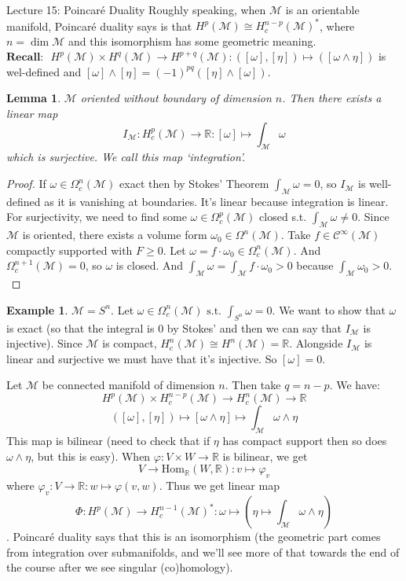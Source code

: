 \documentclass[10pt]{article}
\theoremstyle{plain}
\newtheorem{lemma}[thm]{Lemma}
\theoremstyle{definition}
\newtheorem{exmp}[thm]{Example} %
\newcommand{\st}{\text{ s.t. }}
\newcommand{\Recall}{\textbf{Recall: }}
\newcommand{\Real}{\mathbb{R}}
\newcommand{\man}{\mathcal{M}}
\newcommand{\HomReal}[2]{\text{Hom}_\Real\left(#1,#2\right)}
\newcommand{\pformman}[1]{\Omega^{#1}(\man)}
\newcommand{\compactpformman}[1]{\Omega^{#1}_c(\man)}
\newcommand{\cts}[1]{\mathcal{C}^{\infty}(#1)}
\newcommand{\cohomman}[1]{H^{#1}(\man)}
\newcommand{\compactcohomman}[1]{H_c^{#1}(\man)}
\begin{document}
\begin{section}{Lecture 15: Poincar\'e Duality}
Roughly speaking, when $\man$ is an orientable manifold, Poincar\'e duality says is that $\cohomman{p} \cong \compactcohomman{n-p}^*$, where $n = \dim \man$ and this isomorphism has some geometric meaning.\\
$\Recall$ $\cohomman{p} \times \cohomman{q} \to \cohomman{p+q} : ([\omega],[\eta]) \mapsto ([\omega \wedge \eta] )$ is wel-defined and $[\omega] \wedge [\eta]  = (-1)^{pq}([\eta]\wedge [ \omega])$.
\begin{lemma}
$\man$ oriented without boundary of dimension $n$. Then there exists a linear map 
$$I_\man : \compactcohomman{p} \to \Real: [\omega] \mapsto \int_\man \omega$$
which is surjective. We call this map `integration'.
\end{lemma}
\begin{proof}
If $\omega \in \compactpformman{n}$ exact then by Stokes' Theorem $\int_ \man \omega = 0$, so $I_\man$ is well-defined as it is vanishing at boundaries. It's linear because integration is linear. For surjectivity, we need to find some $\omega \in \compactpformman{p}$ closed s.t. $\int_\man \omega \neq 0$. Since $\man$ is oriented, there exists a volume form $\omega_0 \in \pformman{n} $. Take $f\in \cts{\man}$ compactly supported with $F \geq 0$. Let $\omega = f \cdot \omega_0 \in \compactpformman{n}.$ And $\compactpformman{n+1} = 0$, so $\omega$ is closed. And $\int_\man \omega = \int_\man f \cdot \omega_0 > 0 $ because $\int_\man \omega_0 > 0.$
\end{proof}
\begin{exmp}
$\man = S^n$. Let $\omega \in \compactpformman{n} \st \int_{S^n} \omega = 0.$ We want to show that $\omega$ is exact (so that the integral is 0 by Stokes' and then we can say that $I_\man$ is injective). Since $\man$ is compact, $\compactcohomman{n} \cong \cohomman{n} = \Real$. Alongside $I_\man$ is linear and surjective we must have that it's injective. So $[\omega]=0$. 
\end{exmp}\noindent
Let $\man$ be connected manifold of dimension $n$. Then take $q = n-p$. We have: 
$$
\cohomman{p} \times \compactcohomman{n-p} \to \compactcohomman{n} \to \Real$$
$$([\omega],[\eta]) \mapsto [\omega \wedge \eta] \mapsto \int_\man \omega \wedge \eta$$
This map is bilinear (need to check that if $\eta$ has compact support then so does $\omega \wedge \eta$, but this is easy). When $\varphi : V \times W \to \Real$ is bilinear, we get 
$$V \to \HomReal{W}{\Real}: v \mapsto \varphi_v$$
where $\varphi_v : V \to \Real: w \mapsto \varphi(v,w)$. Thus we get linear map $$\Phi : \cohomman{p} \to \compactcohomman{n-1} ^*:\omega \mapsto (\eta \mapsto \int_\man \omega \wedge \eta)$$. Poincar\'e duality says that this is an isomorphism (the geometric part comes from integration over submanifolds, and we'll see more of that towards the end of the course after we see singular (co)homology).


\end{section}
\end{document}
